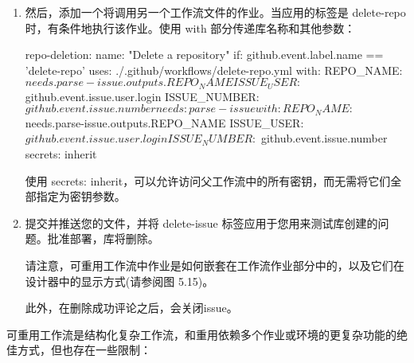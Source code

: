 \begin{enumerate}
\begin{shell}
jobs:
  parse-issue:
    runs-on: ubuntu-latest
    outputs:
      REPO_NAME: ${{ steps.repo-request.outputs.REPO_NAME }}
    steps:
      - name: Issue Forms Body Parser
        id: parse
        uses: zentered/issue-forms-body-parser@v2.0.0
      - name: Repository Request Validation
        id: repo-request
        env:
          GH_TOKEN: ${{ github.token }}
        run: |
          repo_name=$(echo '${{ steps.parse.outputs.data }}' | jq -r '.name.text')
          repo_dept=$(echo '${{ steps.parse.outputs.data }}' | jq -r '.department.text')
          repo_full_name=$repo_dept-$repo_name
          echo "REPO_NAME=$repo_full_name" >> "$GITHUB_OUTPUT"
\end{shell}

\item 
然后，添加一个将调用另一个工作流文件的作业。当应用的标签是 delete-repo 时，有条件地执行该作业。使用 with 部分传递库名称和其他参数：

\begin{shell}
repo-deletion:
  name: "Delete a repository"
  if: github.event.label.name == 'delete-repo'
  uses: ./.github/workflows/delete-repo.yml
  with:
    REPO_NAME: ${{ needs.parse-issue.outputs.REPO_NAME }}
    ISSUE_USER: ${{ github.event.issue.user.login }}
    ISSUE_NUMBER: ${{ github.event.issue.number }}
    needs: parse-issue
  with:
    REPO_NAME: ${{ needs.parse-issue.outputs.REPO_NAME }}
    ISSUE_USER: ${{ github.event.issue.user.login }}
    ISSUE_NUMBER: ${{ github.event.issue.number }}
  secrets: inherit
\end{shell}

使用 secrets: inherit，可以允许访问父工作流中的所有密钥，而无需将它们全部指定为密钥参数。

\item 
提交并推送您的文件，并将 delete-issue 标签应用于您用来测试库创建的问题。批准部署，库将删除。

请注意，可重用工作流中作业是如何嵌套在工作流作业部分中的，以及它们在设计器中的显示方式(请参阅图 5.15)。


此外，在删除成功评论之后，会关闭issue。

\end{enumerate}


可重用工作流是结构化复杂工作流，和重用依赖多个作业或环境的更复杂功能的绝佳方式，但也存在一些限制：

